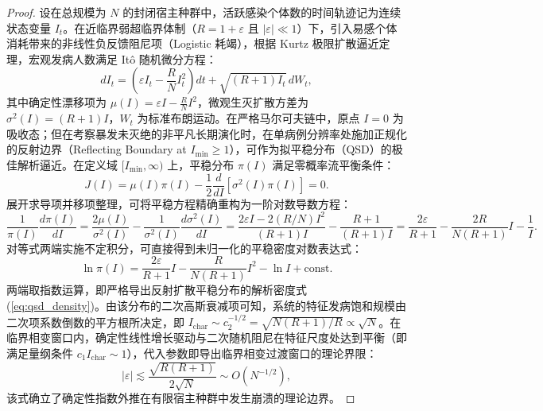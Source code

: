 \documentclass[11pt,a4paper]{article}
\theoremstyle{plain}
\theoremstyle{definition}
\begin{document}
\begin{proof}
设在总规模为 $N$ 的封闭宿主种群中，活跃感染个体数的时间轨迹记为连续状态变量 $I_t$。在近临界弱超临界体制（$R = 1 + \varepsilon$ 且 $|\varepsilon| \ll 1$）下，引入易感个体消耗带来的非线性负反馈阻尼项（Logistic 耗竭），根据 Kurtz 极限扩散逼近定理\citep{ethier1986markov}，宏观发病人数满足 It\^o 随机微分方程：
\begin{equation}
dI_t = \left(\varepsilon I_t - \frac{R}{N}I_t^2\right) dt + \sqrt{(R+1)I_t}\, dW_t,
\end{equation}
其中确定性漂移项为 $\mu(I) = \varepsilon I - \frac{R}{N}I^2$，微观生灭扩散方差为 $\sigma^2(I) = (R+1)I$，$W_t$ 为标准布朗运动。在严格马尔可夫链中，原点 $I=0$ 为吸收态；但在考察暴发未灭绝的非平凡长期演化时，在单病例分辨率处施加正规化的反射边界（Reflecting Boundary at $I_{\min} \ge 1$），可作为拟平稳分布（QSD）的极佳解析逼近\citep{nasell1999quasi, dolgoarshinnykh2006critical}。在定义域 $[I_{\min}, \infty)$ 上，平稳分布 $\pi(I)$ 满足零概率流平衡条件：
\begin{equation}
J(I) = \mu(I)\pi(I) - \frac{1}{2}\frac{d}{dI}[\sigma^2(I)\pi(I)] = 0.
\end{equation}
展开求导项并移项整理，可将平稳方程精确重构为一阶对数导数方程：
\begin{equation}
\frac{1}{\pi(I)}\frac{d\pi(I)}{dI} = \frac{2\mu(I)}{\sigma^2(I)} - \frac{1}{\sigma^2(I)}\frac{d\sigma^2(I)}{dI} = \frac{2\varepsilon I - 2(R/N)I^2}{(R+1)I} - \frac{R+1}{(R+1)I} = \frac{2\varepsilon}{R+1} - \frac{2R}{N(R+1)}I - \frac{1}{I}.
\end{equation}
对等式两端实施不定积分，可直接得到未归一化的平稳密度对数表达式：
\begin{equation}
\ln \pi(I) = \frac{2\varepsilon}{R+1}I - \frac{R}{N(R+1)}I^2 - \ln I + \text{const}.
\end{equation}
两端取指数运算，即严格导出反射扩散平稳分布的解析密度式 (\ref{eq:qsd_density})。由该分布的二次高斯衰减项可知，系统的特征发病饱和规模由二次项系数倒数的平方根所决定，即 $I_{\text{char}} \sim c_2^{-1/2} = \sqrt{N(R+1)/R} \propto \sqrt{N}$。在临界相变窗口内，确定性线性增长驱动与二次随机阻尼在特征尺度处达到平衡（即满足量纲条件 $c_1 I_{\text{char}} \sim 1$），代入参数即导出临界相变过渡窗口的理论界限：
\begin{equation}
|\varepsilon| \lesssim \frac{\sqrt{R(R+1)}}{2\sqrt{N}} \sim O(N^{-1/2}),
\end{equation}
该式确立了确定性指数外推在有限宿主种群中发生崩溃的理论边界。


\end{proof}
\end{document}
